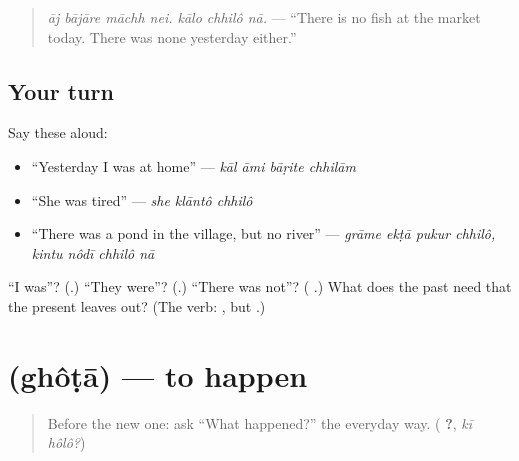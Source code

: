 \begin{quote}
\textbf{      }
\end{quote}

\begin{quote}
\emph{āj bājāre māchh nei. kālo chhilô nā.} — \textquotedblleft{}There is no fish at the market today. There was none yesterday either.\textquotedblright{}
\end{quote}

\subsection*{Your turn}
Say these aloud:

\begin{itemize}
\raggedright
  \item \textquotedblleft{}Yesterday I was at home\textquotedblright{} — \emph{kāl āmi bāṛite chhilām}
  \item \textquotedblleft{}She was tired\textquotedblright{} — \emph{she klāntô chhilô}
  \item \textquotedblleft{}There was a pond in the village, but no river\textquotedblright{} — \emph{grāme ekṭā pukur chhilô, kintu nôdī chhilô nā}
\end{itemize}

\begin{tcolorbox}[breakable,colback=teal!4,colframe=teal!35!black,title={Before you move on}]
\textquotedblleft{}I was\textquotedblright{}? (\textbf{}.) \textquotedblleft{}They were\textquotedblright{}? (\textbf{}.) \textquotedblleft{}There was not\textquotedblright{}? (\textbf{ }.) What does the past need that the present leaves out? (The verb: \textbf{ }, but \textbf{  }.)
\end{tcolorbox}
\section[\texorpdfstring{\bn{ঘটা} (ghôṭā)}{ঘটা (ghôṭā)}]{ (ghôṭā) — to happen}

\label{lesson:BN-C264-ghota}



\begin{quote}
Before the new one: ask \textquotedblleft{}What happened?\textquotedblright{} the everyday way. (\textbf{ ?}, \emph{kī hôlô?})
\end{quote}

